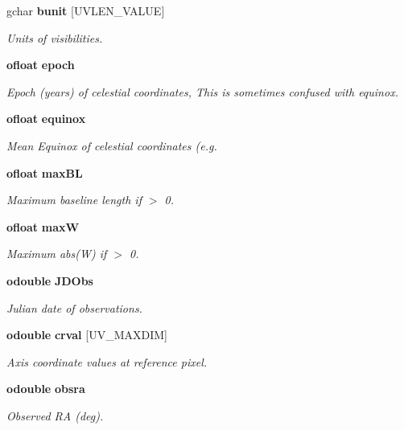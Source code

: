 \begin{CompactItemize}
gchar {\bf bunit} [UVLEN\_\-VALUE]
\begin{CompactList}\small\item\em Units of visibilities. \item\end{CompactList}\item 
{\bf ofloat} {\bf epoch}
\begin{CompactList}\small\item\em Epoch (years) of celestial coordinates, This is sometimes confused with equinox. \item\end{CompactList}\item 
{\bf ofloat} {\bf equinox}
\begin{CompactList}\small\item\em Mean Equinox of celestial coordinates (e.g. \item\end{CompactList}\item 
{\bf ofloat} {\bf max\-BL}
\begin{CompactList}\small\item\em Maximum baseline length if $>$ 0. \item\end{CompactList}\item 
{\bf ofloat} {\bf max\-W}
\begin{CompactList}\small\item\em Maximum abs(W) if $>$ 0. \item\end{CompactList}\item 
{\bf odouble} {\bf JDObs}
\begin{CompactList}\small\item\em Julian date of observations. \item\end{CompactList}\item 
{\bf odouble} {\bf crval} [UV\_\-MAXDIM]
\begin{CompactList}\small\item\em Axis coordinate values at reference pixel. \item\end{CompactList}\item 
{\bf odouble} {\bf obsra}
\begin{CompactList}\small\item\em Observed RA (deg). \item\end{CompactList}\item 

\end{CompactItemize}
